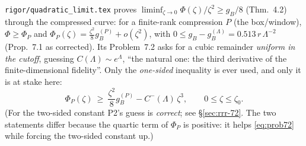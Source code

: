 \documentclass[11pt]{article}
\begin{document}
\texttt{rigor/quadratic\_limit.tex} proves $\liminf_{\zeta\to0}\Phi(\zeta)/\zeta^2\ge g_B/8$
(Thm.~4.2) through the compressed curve: for a finite-rank compression $P$ (the box/window),
$\Phi\ge\Phi_P$ and $\Phi_P(\zeta)=\frac{\zeta^2}8g_B^{(P)}+o(\zeta^2)$, with
$0\le g_B-g_B^{(\Lambda)}=0.513\,r\,\Lambda^{-2}$ (Prop.~7.1 as corrected).  Its Problem~7.2 asks for
a cubic remainder \emph{uniform in the cutoff}, guessing $C(\Lambda)\sim e^\Lambda$, ``the natural
one: the third derivative of the finite-dimensional fidelity''.  Only the \emph{one-sided}
inequality is ever used, and only it is at stake here:
\begin{equation}\label{eq:prob72}
 \Phi_P(\zeta)\ \ge\ \frac{\zeta^2}8g_B^{(P)}-C^-(\Lambda)\,\zeta^3 ,\qquad 0\le\zeta\le\zeta_0 .
\end{equation}
(For the two-sided constant P2's guess is \emph{correct}; see \S\ref{sec:rrr-72}.  The two
statements differ because the quartic term of $\Phi_P$ is positive: it helps \eqref{eq:prob72}
while forcing the two-sided constant up.)
\end{document}
